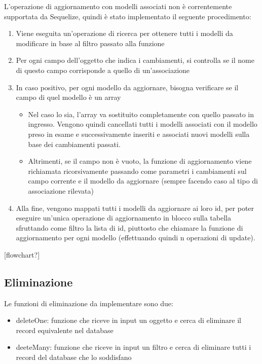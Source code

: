\documentclass[a4paper, 12pt]{scrartcl}
\begin{document}
      L'operazione di aggiornamento con modelli associati non è correntemente supportata da Sequelize, quindi è stato implementato il seguente procedimento:\\
      \begin{enumerate}
        \item Viene eseguita un'operazione di ricerca per ottenere tutti i modelli da modificare in base al filtro passato alla funzione
        \item Per ogni campo dell'oggetto che indica i cambiamenti, si controlla se il nome di questo campo corrisponde a quello di un'associazione
        \item In caso positivo, per ogni modello da aggiornare, bisogna verificare se il campo di quel modello è un array
        \begin{itemize}
          \item Nel caso lo sia, l'array va sostituito completamente con quello passato in ingresso. Vengono quindi cancellati tutti i modelli associati con il modello preso in esame e
          successivamente inseriti e associati nuovi modelli sulla base dei cambiamenti passati.
          \item Altrimenti, se il campo non è vuoto, la funzione di aggiornamento viene richiamata ricorsivamente passando come parametri i cambiamenti sul campo corrente e il modello da aggiornare (sempre facendo caso al tipo di associazione rilevata)
        \end{itemize}
        \item Alla fine, vengono mappati tutti i modelli da aggiornare ai loro id, per poter eseguire un'unica operazione di aggiornamento in blocco sulla tabella sfruttando come filtro la lista di id, piuttosto che chiamare la funzione di aggiornamento per ogni modello (effettuando quindi n operazioni di update).
      \end{enumerate}
        
      [flowchart?]

    \newpage
    \subsection*{Eliminazione}
      Le funzioni di eliminazione da implementare sono due:
      \begin{itemize}
        \item deleteOne: funzione che riceve in input un oggetto e cerca di eliminare il record equivalente nel database
        \item deeteMany: funzione che riceve in input un filtro e cerca di eliminare tutti i record del database che lo soddisfano
      \end{itemize}
\end{document}

